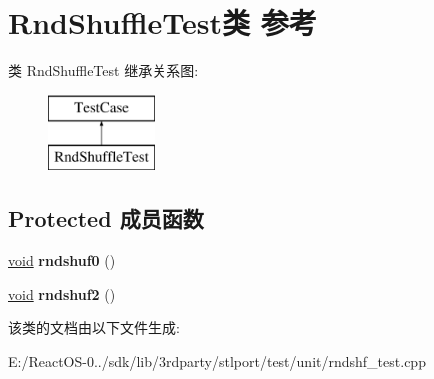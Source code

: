 \hypertarget{class_rnd_shuffle_test}{}\section{Rnd\+Shuffle\+Test类 参考}
\label{class_rnd_shuffle_test}
类 Rnd\+Shuffle\+Test 继承关系图\+:\begin{figure}[H]
\begin{center}
\leavevmode
\includegraphics[height=2.000000cm]{class_rnd_shuffle_test}
\end{center}
\end{figure}
\subsection*{Protected 成员函数}
\begin{DoxyCompactItemize}
\item 
\mbox{\label{class_rnd_shuffle_test_a4414d5c06c2abe143d303d89e27b8071}} 
\hyperlink{interfacevoid}{void} {\bfseries rndshuf0} ()
\item 
\mbox{\label{class_rnd_shuffle_test_af7a5013a7b01bf0d07e29699150f6d1d}} 
\hyperlink{interfacevoid}{void} {\bfseries rndshuf2} ()
\end{DoxyCompactItemize}


该类的文档由以下文件生成\+:\begin{DoxyCompactItemize}
\item 
E\+:/\+React\+O\+S-\/0../sdk/lib/3rdparty/stlport/test/unit/rndshf\+\_\+test.\+cpp\end{DoxyCompactItemize}
